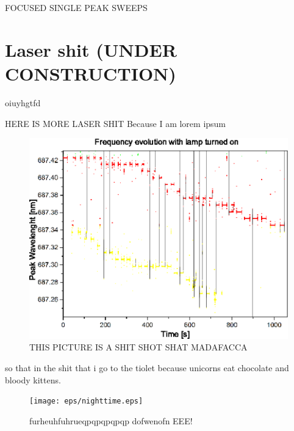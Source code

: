 FOCUSED SINGLE PEAK SWEEPS
 
	\section{Laser shit (UNDER CONSTRUCTION)}
oiuyhgtfd

HERE IS MORE LASER SHIT
Because I am lorem ipsum
\begin{figure}[!htb]\centering
\vfill
\includegraphics[width=\linewidth, draft=\foto]{eps/enlarged.eps}
\caption{THIS PICTURE IS A SHIT SHOT SHAT MADAFACCA}
\label{enged}
\end{figure}
so that in the shit that i go to the tiolet because unicorns eat chocolate and bloody kittens.
\begin{figure}[!htb]\centering
\texttt{[image: eps/nighttime.eps]}
\caption{furheuhfuhrueqpqpqpqpqp  dofwenofn EEE!}
\label{enorme}
\end{figure}

